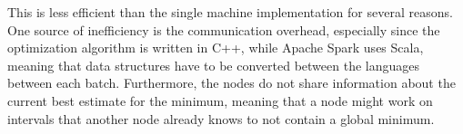 \documentclass[scalable-gopt.tex]{subfiles}
\begin{document}
  This is less efficient than the single machine implementation for several reasons.
  One source of inefficiency is the communication overhead, 
  especially since the optimization algorithm is written in C++, 
  while Apache Spark uses Scala, meaning that data structures 
  have to be converted between the languages between each batch.
  Furthermore, the nodes do not share information about 
  the current best estimate for the minimum, 
  meaning that a node might work on intervals that 
  another node already knows to not contain a global minimum.  
  
\end{document}
